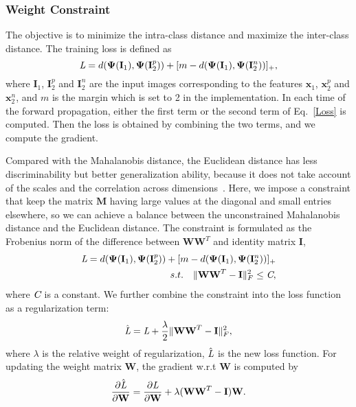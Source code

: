 \documentclass[runningheads]{llncs}
\begin{document}
\subsubsection{Weight Constraint}
The objective is to minimize the intra-class distance and maximize the inter-class distance.
The training loss is defined as
\begin{equation}\label{Loss}
    \mathbf{\emph{L}} = d(\mathbf{\Psi}(\mathbf{I}_1), \mathbf{\Psi}(\mathbf{I}_2^p)) +
    [m - d(\mathbf{\Psi}(\mathbf{I}_1), \mathbf{\Psi}(\mathbf{I}_2^n))]_{+},
\end{equation}
where $\mathbf{I}_1$, $\mathbf{I}_2^p$ and $\mathbf{I}_2^n$ are the input images corresponding to the features $\mathbf{x}_1$, $\mathbf{x}_2^p$ and $\mathbf{x}_2^n$, and $m$ is the margin which is set to 2 in the implementation.
In each time of the forward propagation, either the first term or the second term of Eq.~\ref{Loss} is computed.
Then the loss is obtained by combining the two terms, and we compute the gradient.

Compared with the Mahalanobis distance, the Euclidean distance has less discriminability but better generalization ability, because it does not take account of the scales and the correlation across dimensions~\cite{manly2004multivariate}.
Here, we impose a constraint that keep the matrix $\textbf{M}$ having large values at the diagonal and small entries elsewhere, so we can achieve a balance between the unconstrained Mahalanobis distance and the Euclidean distance.
The constraint is formulated as the Frobenius norm of the difference between $\textbf{W}\textbf{W}^T$ and identity matrix $\mathbf{I}$,
\begin{align}\label{Loss-st}
    \mathbf{\emph{L}} = d(\mathbf{\Psi}(\mathbf{I}_1), \mathbf{\Psi}(\mathbf{I}_2^p)) + [m - d(\mathbf{\Psi}(\mathbf{I}_1), \mathbf{\Psi}(\mathbf{I}_2^n))]_{+}      \nonumber   \\
    s.t. \quad \|\textbf{W}\textbf{W}^T - \mathbf{I}\|^2_F \leq \emph{C},
\end{align}
where $\emph{C}$ is a constant. We further combine the constraint into the loss function as a regularization term:
\begin{equation}\label{Loss-lambda}
    \hat{ \mathbf{\emph{L}} } = \mathbf{\emph{L}} + \frac{\lambda}{2} \|\textbf{W}\textbf{W}^T - \mathbf{I}\|^2_F,
\end{equation}
where $\lambda$ is the relative weight of regularization, $\hat{ \mathbf{\emph{L}} }$ is the new loss function.
For updating the weight matrix $\textbf{W}$, the gradient w.r.t $\textbf{W}$ is computed by
\begin{equation}\label{Loss-gradient}
    \frac{\partial \hat{ \mathbf{\emph{L}} }}{\partial \textbf{W}} =
    \frac{\partial \mathbf{\emph{L}}}{\partial \textbf{W}} + \lambda (\textbf{W}\textbf{W}^T - \mathbf{I})\textbf{W}.
\end{equation}
\end{document}
